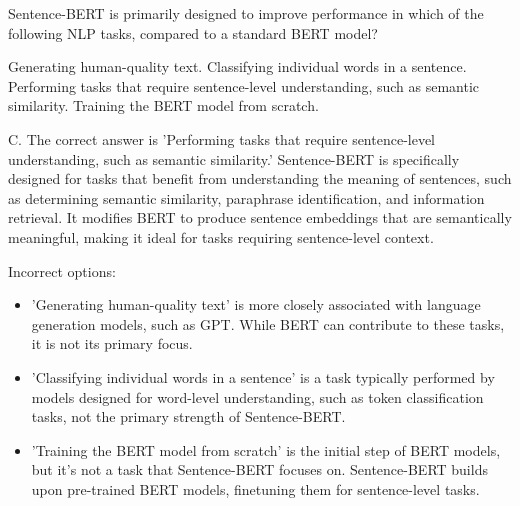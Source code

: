 \documentclass[11pt,addpoints,answers]{exam}
\begin{document}
\begin{questions}
\question[1] Sentence-BERT is primarily designed to improve performance in which of the following NLP tasks, compared to a standard BERT model?
  \begin{choices}
    \choice Generating human-quality text.
    \choice Classifying individual words in a sentence.
    \choice Performing tasks that require sentence-level understanding, such as semantic similarity.
    \choice Training the BERT model from scratch.
  \end{choices}
\begin{solution}
C. The correct answer is 'Performing tasks that require sentence-level understanding, such as semantic similarity.' Sentence-BERT is specifically designed for tasks that benefit from understanding the meaning of sentences, such as determining semantic similarity, paraphrase identification, and information retrieval. It modifies BERT to produce sentence embeddings that are semantically meaningful, making it ideal for tasks requiring sentence-level context.

  Incorrect options:
  \begin{itemize}
    \item 'Generating human-quality text' is more closely associated with language generation models, such as GPT. While BERT can contribute to these tasks, it is not its primary focus.
    \item 'Classifying individual words in a sentence' is a task typically performed by models designed for word-level understanding, such as token classification tasks, not the primary strength of Sentence-BERT.
    \item 'Training the BERT model from scratch' is the initial step of BERT models, but it's not a task that Sentence-BERT focuses on. Sentence-BERT builds upon pre-trained BERT models, finetuning them for sentence-level tasks.
  \end{itemize}
\end{solution}


\end{questions}
\end{document}
